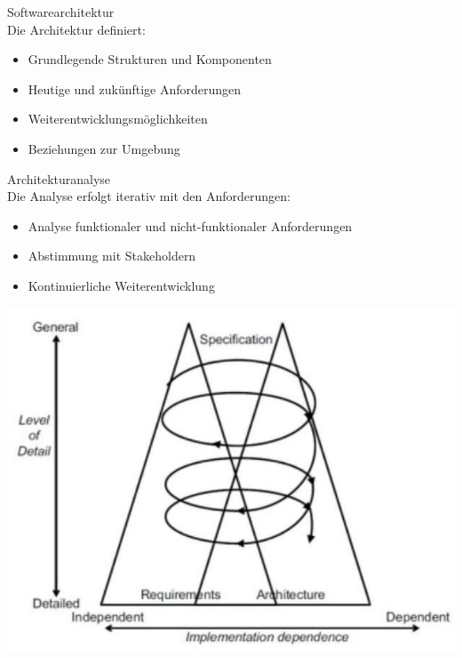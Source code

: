 \begin{definition}{Softwarearchitektur}\\
Die Architektur definiert:
\begin{itemize}
    \item Grundlegende Strukturen und Komponenten
    \item Heutige und zukünftige Anforderungen
    \item Weiterentwicklungsmöglichkeiten
    \item Beziehungen zur Umgebung
\end{itemize}
\end{definition}

\begin{concept}{Architekturanalyse}\\
Die Analyse erfolgt iterativ mit den Anforderungen:
\begin{itemize}
    \item Analyse funktionaler und nicht-funktionaler Anforderungen
    \item Abstimmung mit Stakeholdern
    \item Kontinuierliche Weiterentwicklung
\end{itemize}
\includegraphics[width=0.9\linewidth]{images/2024_12_29_0d1d7b5551ea1b4b41bdg-08}
\end{concept}

